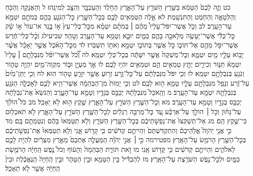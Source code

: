 \documentclass[twoside, openany, parskip=half, 11pt]{book}
\begin{document}
כט וְזֶ֤ה לָכֶם֙ הַטָּמֵ֔א בַּשֶּׁ֖רֶץ הַשֹּׁרֵ֣ץ עַל־הָאָ֑רֶץ הַחֹ֥לֶד וְהָעַכְבָּ֖ר וְהַצָּ֥ב לְמִינֵֽהוּ׃ ל וְהָאֲנָקָ֥ה וְהַכֹּ֖חַ וְהַלְּטָאָ֑ה וְהַחֹ֖מֶט וְהַתִּנְשָֽׁמֶת׃ לא אֵ֛לֶּה הַטְּמֵאִ֥ים לָכֶ֖ם בְּכׇל־הַשָּׁ֑רֶץ כׇּל־הַנֹּגֵ֧עַ בָּהֶ֛ם בְּמֹתָ֖ם יִטְמָ֥א עַד־הָעָֽרֶב׃ לב וְכֹ֣ל אֲשֶׁר־יִפֹּל־עָלָיו֩ מֵהֶ֨ם ׀ בְּמֹתָ֜ם יִטְמָ֗א מִכׇּל־כְּלִי־עֵץ֙ א֣וֹ בֶ֤גֶד אוֹ־עוֹר֙ א֣וֹ שָׂ֔ק כׇּל־כְּלִ֕י אֲשֶׁר־יֵעָשֶׂ֥ה מְלָאכָ֖ה בָּהֶ֑ם בַּמַּ֧יִם יוּבָ֛א וְטָמֵ֥א עַד־הָעֶ֖רֶב וְטָהֵֽר׃ שביעילג וְכׇ֨ל־כְּלִי־חֶ֔רֶשׂ אֲשֶׁר־יִפֹּ֥ל מֵהֶ֖ם אֶל־תּוֹכ֑וֹ כֹּ֣ל אֲשֶׁ֧ר בְּתוֹכ֛וֹ יִטְמָ֖א וְאֹת֥וֹ תִשְׁבֹּֽרוּ׃ לד מִכׇּל־הָאֹ֜כֶל אֲשֶׁ֣ר יֵאָכֵ֗ל אֲשֶׁ֨ר יָב֥וֹא עָלָ֛יו מַ֖יִם יִטְמָ֑א וְכׇל־מַשְׁקֶה֙ אֲשֶׁ֣ר יִשָּׁתֶ֔ה בְּכׇל־כְּלִ֖י יִטְמָֽא׃ לה וְ֠כֹ֠ל אֲשֶׁר־יִפֹּ֨ל מִנִּבְלָתָ֥ם ׀ עָלָיו֮ יִטְמָא֒ תַּנּ֧וּר וְכִירַ֛יִם יֻתָּ֖ץ טְמֵאִ֣ים הֵ֑ם וּטְמֵאִ֖ים יִהְי֥וּ לָכֶֽם׃ לו אַ֣ךְ מַעְיָ֥ן וּב֛וֹר מִקְוֵה־מַ֖יִם יִהְיֶ֣ה טָה֑וֹר וְנֹגֵ֥עַ בְּנִבְלָתָ֖ם יִטְמָֽא׃ לז וְכִ֤י יִפֹּל֙ מִנִּבְלָתָ֔ם עַל־כׇּל־זֶ֥רַע זֵר֖וּעַ אֲשֶׁ֣ר יִזָּרֵ֑עַ טָה֖וֹר הֽוּא׃ לח וְכִ֤י יֻתַּן־מַ֙יִם֙ עַל־זֶ֔רַע וְנָפַ֥ל מִנִּבְלָתָ֖ם עָלָ֑יו טָמֵ֥א ה֖וּא לָכֶֽם׃
לט וְכִ֤י יָמוּת֙ מִן־הַבְּהֵמָ֔ה אֲשֶׁר־הִ֥יא לָכֶ֖ם לְאׇכְלָ֑ה הַנֹּגֵ֥עַ בְּנִבְלָתָ֖הּ יִטְמָ֥א עַד־הָעָֽרֶב׃ מ וְהָֽאֹכֵל֙ מִנִּבְלָתָ֔הּ יְכַבֵּ֥ס בְּגָדָ֖יו וְטָמֵ֣א עַד־הָעָ֑רֶב וְהַנֹּשֵׂא֙ אֶת־נִבְלָתָ֔הּ יְכַבֵּ֥ס בְּגָדָ֖יו וְטָמֵ֥א עַד־הָעָֽרֶב׃ מא וְכׇל־הַשֶּׁ֖רֶץ הַשֹּׁרֵ֣ץ עַל־הָאָ֑רֶץ שֶׁ֥קֶץ ה֖וּא לֹ֥א יֵאָכֵֽל׃ מב כֹּל֩ הוֹלֵ֨ךְ עַל־גָּח֜וֹן וְכֹ֣ל ׀ הוֹלֵ֣ךְ עַל־אַרְבַּ֗ע עַ֚ד כׇּל־מַרְבֵּ֣ה רַגְלַ֔יִם לְכׇל־הַשֶּׁ֖רֶץ הַשֹּׁרֵ֣ץ עַל־הָאָ֑רֶץ לֹ֥א תֹאכְל֖וּם כִּי־שֶׁ֥קֶץ הֵֽם׃ מג אַל־תְּשַׁקְּצוּ֙ אֶת־נַפְשֹׁ֣תֵיכֶ֔ם בְּכׇל־הַשֶּׁ֖רֶץ הַשֹּׁרֵ֑ץ וְלֹ֤א תִֽטַּמְּאוּ֙ בָּהֶ֔ם וְנִטְמֵתֶ֖ם בָּֽם׃ מד כִּ֣י אֲנִ֣י יְהֹוָה֮ אֱלֹֽהֵיכֶם֒ וְהִתְקַדִּשְׁתֶּם֙ וִהְיִיתֶ֣ם קְדֹשִׁ֔ים כִּ֥י קָד֖וֹשׁ אָ֑נִי וְלֹ֤א תְטַמְּאוּ֙ אֶת־נַפְשֹׁ֣תֵיכֶ֔ם בְּכׇל־הַשֶּׁ֖רֶץ הָרֹמֵ֥שׂ עַל־הָאָֽרֶץ׃ מפטירמה כִּ֣י ׀ אֲנִ֣י יְהֹוָ֗ה הַֽמַּעֲלֶ֤ה אֶתְכֶם֙ מֵאֶ֣רֶץ מִצְרַ֔יִם לִהְיֹ֥ת לָכֶ֖ם לֵאלֹהִ֑ים וִהְיִיתֶ֣ם קְדֹשִׁ֔ים כִּ֥י קָד֖וֹשׁ אָֽנִי׃ מו זֹ֣את תּוֹרַ֤ת הַבְּהֵמָה֙ וְהָע֔וֹף וְכֹל֙ נֶ֣פֶשׁ הַֽחַיָּ֔ה הָרֹמֶ֖שֶׂת בַּמָּ֑יִם וּלְכׇל־נֶ֖פֶשׁ הַשֹּׁרֶ֥צֶת עַל־הָאָֽרֶץ׃ מז לְהַבְדִּ֕יל בֵּ֥ין הַטָּמֵ֖א וּבֵ֣ין הַטָּהֹ֑ר וּבֵ֤ין הַֽחַיָּה֙ הַֽנֶּאֱכֶ֔לֶת וּבֵין֙ הַֽחַיָּ֔ה אֲשֶׁ֖ר לֹ֥א תֵאָכֵֽל׃
\end{document}
